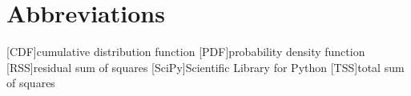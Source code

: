 
\chapter*{Abbreviations}
	\begin{acronym}[SciPy]
		\setlength{\itemsep}{-\parsep}
		[\textup{CDF}]{cumulative distribution function}
		[\textup{PDF}]{probability density function}
		[\textup{RSS}]{residual sum of squares}
		[\textup{SciPy}]{Scientific Library for Python}
		[\textup{TSS}]{total sum of squares}
	
	\end{acronym}

	
	